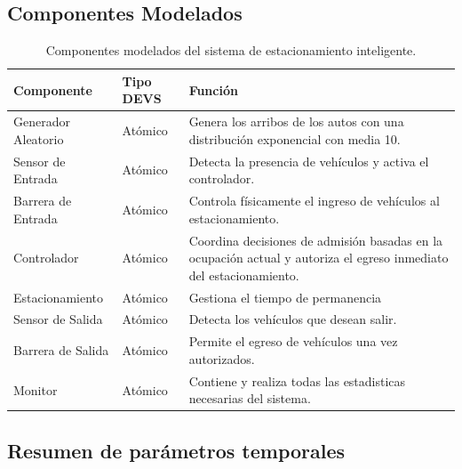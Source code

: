 \documentclass[12pt]{article}
\begin{document}
\subsection{Componentes Modelados}

\begin{table}[H]
\centering
\begin{tabular}{|l|l|p{8cm}|}
\hline
\textbf{Componente} & \textbf{Tipo DEVS} & \textbf{Función} \\ \hline
Generador Aleatorio      & Atómico            & Genera los arribos de los autos con una distribución exponencial con media 10. \\ \hline
Sensor de Entrada      & Atómico            & Detecta la presencia de vehículos y activa el controlador. \\ \hline
Barrera de Entrada     & Atómico            & Controla físicamente el ingreso de vehículos al estacionamiento. \\ \hline
Controlador    & Atómico & Coordina decisiones de admisión basadas en la ocupación actual y autoriza el egreso inmediato del estacionamiento. \\ \hline
Estacionamiento        & Atómico            & Gestiona el tiempo de permanencia \\ \hline
Sensor de Salida       & Atómico            & Detecta los vehículos que desean salir. \\ \hline
Barrera de Salida      & Atómico            & Permite el egreso de vehículos una vez autorizados. \\ \hline
Monitor     & Atómico            & Contiene y realiza todas las estadisticas necesarias del sistema. \\ \hline
\end{tabular}
\caption{Componentes modelados del sistema de estacionamiento inteligente.}
\end{table}

\clearpage

\subsection{Resumen de parámetros temporales}
\end{document}
